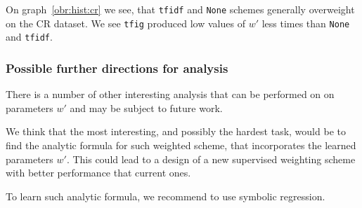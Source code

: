     On graph~\ref{obr:hist:cr} we see, that \texttt{tfidf} and \texttt{None} schemes generally overweight on the CR dataset.
    We see \texttt{tfig} produced low values of $w'$ less times than \texttt{None} and \texttt{tfidf}.
    
    \subsubsection{Possible further directions for analysis}
    
    There is a number of other interesting analysis that can be performed on on parameters $w'$ and may be subject to future work.
    
    We think that the most interesting, and possibly the hardest task, would be to find the analytic formula for such weighted scheme, that incorporates the learned parameters $w'$. 
    This could lead to a design of a new supervised weighting scheme with better performance that current ones.
    
    To learn such analytic formula, we recommend to use symbolic regression.
